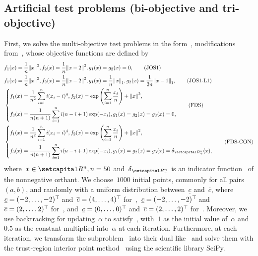 \documentclass[../main]{subfiles}
\begin{document}
\subsection{Artificial test problems (bi-objective and tri-objective)}
First, we solve the multi-objective test problems in the form~, modifications from~\cite{Jin2001,Fliege2009}, whose objective functions are defined by
\begin{align}
    &f_1(x) = \frac{1}{n} \norm*{x}^2,
    f_2(x) = \frac{1}{n} \norm*{x - 2}^2,
    g_1(x) = g_2(x) = 0, \tag{JOS1}\label{eq:JOS1} \\
    &f_1(x) = \frac{1}{n} \norm*{x}^2,
    f_2(x) = \frac{1}{n} \norm*{x - 2}^2,
    g_1(x) = \frac{1}{n} \norm*{x}_1,
    g_2(x) = \frac{1}{2n} \norm*{x - 1}_1,
    \label{eq:JOS1_L1} \tag{JOS1-L1}\\
    &\left\{\begin{aligned} 
            f_1(x) &= \frac{1}{n^2} \sum_{i = 1}^{n} i (x_i - i)^4,
            f_2(x) = \exp \left( \sum_{i = 1}^{n} \frac{x_i}{n} \right) + \norm*{x}^2,\\
            f_3(x) &= \frac{1}{n (n + 1)} \sum_{i = 1}^{n} i (n - i + 1) \exp (- x_i),
            g_1(x) = g_2(x) = g_3(x) = 0,
    \end{aligned} \right. \label{eq:FDS} \tag{FDS}\\
    &\left\{\begin{aligned} 
            f_1(x) &= \frac{1}{n^2} \sum_{i = 1}^{n} i (x_i - i)^4,
            f_2(x) = \exp \left( \sum_{i = 1}^{n} \frac{x_i}{n} \right) + \norm*{x}^2,\\
            f_3(x) &= \frac{1}{n (n + 1)} \sum_{i = 1}^{n} i (n - i + 1) \exp (- x_i),
            g_1(x) = g_2(x) = g_3(x) = \indicator_{\setRpos^n}(x),
    \end{aligned} \right.\label{eq:FDS_CONSTRAINED} \tag{FDS-CON}
\end{align}
where~$x \in \setR^n, n = 50$ and~$\indicator_{\setRpos^n}$ is an indicator function~ of the nonnegative orthant.
We choose~$1000$ initial points, commonly for all pairs~$(a, b)$, and randomly with a uniform distribution between~$\underline{c}$ and~$\overline{c}$, where~$\underline{c} = (-2, \dots, -2)^\top\hspace{-1pt}$ and~$\overline{c} = (4, \dots, 4)^\top\hspace{-1pt}$ for~,~$\underline{c} = (-2, \dots, -2)^\top\hspace{-1pt}$ and~$\overline{c} = (2, \dots, 2)^\top\hspace{-1pt}$ for~, and~$\underline{c} = (0, \dots, 0)^\top\hspace{-1pt}$ and~$\overline{c} = (2, \dots, 2)^\top\hspace{-1pt}$ for~.
Moreover, we use backtracking for updating~$\alpha$ to satisfy~, with~$1$ as the initial value of~$\alpha$ and~$0.5$ as the constant multiplied into~$\alpha$ at each iteration.
Furthermore, at each iteration, we transform the subproblem~ into their dual like~ and solve them with the trust-region interior point method~\cite{Byrd1999} using the scientific library SciPy.
\end{document}
